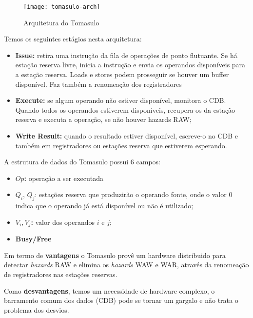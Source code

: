 \begin{figure}[ht]
  \centering
  \texttt{[image: tomasulo-arch]}
  \caption{Arquitetura do Tomasulo}
  \label{fig:tomasulo-arch}
\end{figure}

Temos os seguintes estágios nesta arquitetura:
\begin{itemize}
  \item \textbf{Issue:} retira uma instrução da fila de operações de ponto flutuante. Se há estação reserva livre, inicia a instrução e envia os operandos disponíveis para a estação reserva. Loads e stores podem prosseguir se houver um buffer disponível. Faz também a renomeação dos registradores

  \item \textbf{Execute:} se algum operando não estiver disponível, monitora o CDB. Quando todos os operandos estiverem disponíveis, recupera-os da estação reserva e executa a operação, se não houver hazards RAW;

  \item \textbf{Write Result:} quando o resultado estiver disponível, escreve-o no CDB e também em registradores ou estações reserva que estiverem esperando.
\end{itemize}

A estrutura de dados do Tomasulo possui 6 campos:
\begin{itemize}
  \item \textbf{$Op$:} operação a ser executada

  \item $Q_i$, $Q_j$: estações reserva que produzirão o operando fonte, onde o valor 0 indica que o operando já está disponível ou não é utilizado;

  \item \textbf{$V_i, V_j$:} valor dos operandos $i$ e $j$;

  \item \textbf{Busy/Free}
\end{itemize}

Em termo de \textbf{vantagens} o Tomasulo provê um hardware distribuido para detectar \textit{hazards} RAW e elimina os \textit{hazards} WAW e WAR, através da renomeação de registradores nas estações reservas.

Como \textbf{desvantagens}, temos um necessidade de hardware complexo, o barramento comum dos dados (CDB) pode se tornar um gargalo e não trata o problema dos desvios.






